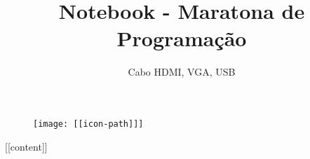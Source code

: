 \documentclass{article}
\title{Notebook - Maratona de Programação}
\author{Cabo HDMI, VGA, USB}
\date{}
\begin{document}
\begin{figure}[t]
\texttt{[image: [[icon-path]]]}
\centering
\end{figure}
\maketitle
\begin{multicols}{2}

\tableofcontents

\newpage

[[content]]

\end{multicols}
\end{document}
